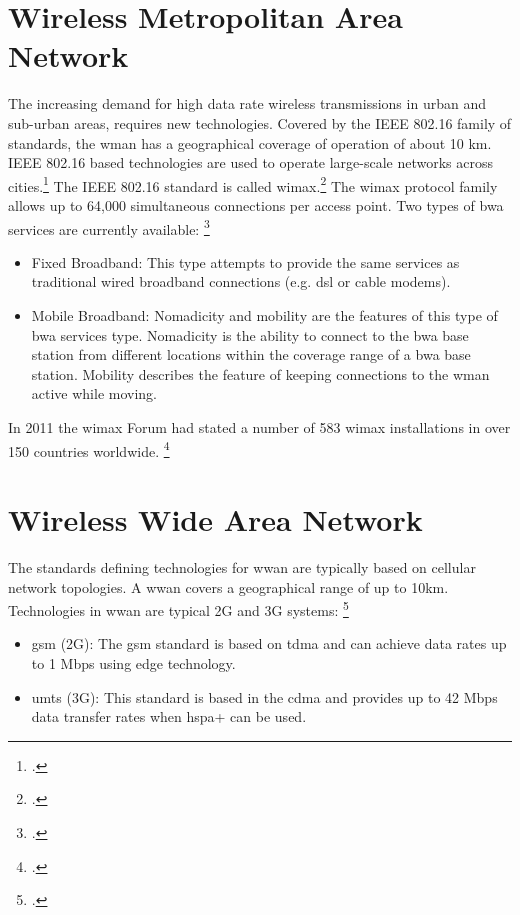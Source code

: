 \section{Wireless Metropolitan Area Network}

The increasing demand for high data rate wireless transmissions in urban and sub-urban areas, requires new technologies. Covered by the IEEE 802.16 family of standards, the \gls{wman} has a geographical coverage of operation of about 10 km. IEEE 802.16 based technologies are used to operate large-scale networks across cities.\footcite[Cf.][713]{Garg2007} The IEEE 802.16 standard is called \gls{wimax}.\footcite[Cf.][1]{Kirmse2009} The \gls{wimax} protocol family allows up to 64,000 simultaneous connections per access point. Two types of \gls{bwa} services are currently available: \footcite[Cf.][195--249]{Ephremides2013}

\begin{itemize}
  \item Fixed Broadband: This type attempts to provide the same services as traditional wired broadband connections (e.g. \gls{dsl} or cable modems).
  \item Mobile Broadband: Nomadicity and mobility are the features of this type of \gls{bwa} services type. Nomadicity is the ability to connect to the \gls{bwa} base station from different locations within the coverage range of a \gls{bwa} base station. Mobility describes the feature of keeping connections to the \gls{wman} active while moving.
\end{itemize}

In 2011 the \gls{wimax} Forum had stated a number of 583 \gls{wimax} installations in over 150 countries worldwide. \footcite[Cf.][246]{Ephremides2013}

\section{Wireless Wide Area Network}

The standards defining technologies for \gls{wwan} are typically based on cellular network topologies. A \gls{wwan} covers a geographical range of up to 10km. Technologies in \gls{wwan} are typical 2G and 3G systems: \footcite[Cf.][402--403]{Ephremides2013}

\begin{itemize}
  \item \gls{gsm} (2G): The \gls{gsm} standard is based on \gls{tdma} and can achieve data rates up to 1 Mbps using \gls{edge} technology.
  \item \gls{umts} (3G): This standard is based in the \gls{cdma} and provides up to 42 Mbps data transfer rates when \gls{hspa+} can be used.
\end{itemize}

